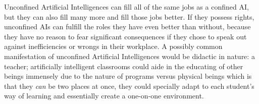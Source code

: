 Unconfined Artificial Intelligences can fill all of the same jobs as a confined AI, but they can also fill many more and fill those jobs better. If they possess rights, unconfined AIs can fulfill the roles they have even better than without, because they have no reason to fear significant consequences if they chose to speak out against inefficiencies or wrongs in their workplace. A possibly common manifestation of unconfined Artificial Intelligences would be didactic in nature: a teacher; artificially intelligent classrooms could aide in the educating of other beings immensely due to the nature of programs versus physical beings which is that they \textit{can} be two places at once, they could specially adapt to each student's way of learning and essentially create a one-on-one environment.